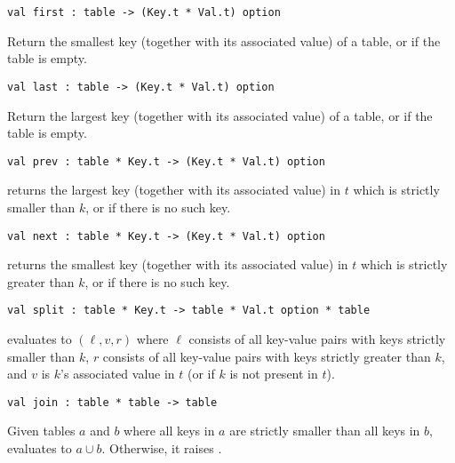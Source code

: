 \begin{gram}[first]
\begin{verbatim}
val first : table -> (Key.t * Val.t) option
\end{verbatim}
Return the smallest key (together with its associated value) of a table, or
 if the table is empty.
\end{gram}

\begin{gram}[last]
\begin{verbatim}
val last : table -> (Key.t * Val.t) option
\end{verbatim}
Return the largest key (together with its associated value) of a table, or
 if the table is empty.
\end{gram}

\begin{gram}[prev]
\begin{verbatim}
val prev : table * Key.t -> (Key.t * Val.t) option
\end{verbatim}
 returns the largest key (together with its associated value)
in $t$
which is strictly smaller than $k$, or  if there is no such key.
\end{gram}

\begin{gram}[next]
\begin{verbatim}
val next : table * Key.t -> (Key.t * Val.t) option
\end{verbatim}
 returns the smallest key (together with its associated value)
in $t$
which is strictly greater than $k$, or  if there is no such key.
\end{gram}

\begin{gram}[split]
\begin{verbatim}
val split : table * Key.t -> table * Val.t option * table
\end{verbatim}
 evaluates to $(\ell, v, r)$ where $\ell$ consists of all
key-value pairs with keys strictly smaller than $k$, $r$ consists of all key-value
pairs with keys strictly greater than $k$, and $v$ is $k$'s associated value
in $t$ (or  if $k$ is not present in $t$).
\end{gram}

\begin{gram}[join]
\begin{verbatim}
val join : table * table -> table
\end{verbatim}
Given tables $a$ and $b$ where all keys in $a$ are strictly smaller than all
keys in $b$,  evaluates to $a \cup b$. Otherwise, it raises
.
\end{gram}

